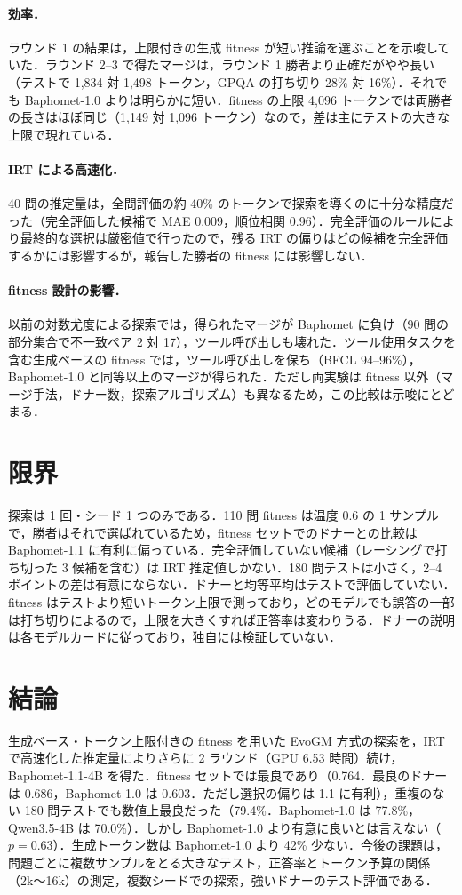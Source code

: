 \documentclass[uplatex,dvipdfmx,10pt,a4paper]{jsarticle}
\begin{document}
\paragraph{効率．}ラウンド 1 の結果は，上限付きの生成 fitness が短い推論を選ぶことを示唆していた．ラウンド 2--3 で得たマージは，ラウンド 1 勝者より正確だがやや長い（テストで 1,834 対 1,498 トークン，GPQA の打ち切り 28\% 対 16\%）．それでも Baphomet-1.0 よりは明らかに短い．fitness の上限 4,096 トークンでは両勝者の長さはほぼ同じ（1,149 対 1,096 トークン）なので，差は主にテストの大きな上限で現れている．

\paragraph{IRT による高速化．}40 問の推定量は，全問評価の約 40\% のトークンで探索を導くのに十分な精度だった（完全評価した候補で MAE 0.009，順位相関 0.96）．完全評価のルールにより最終的な選択は厳密値で行ったので，残る IRT の偏りはどの候補を完全評価するかには影響するが，報告した勝者の fitness には影響しない．

\paragraph{fitness 設計の影響．}以前の対数尤度による探索では，得られたマージが Baphomet に負け（90 問の部分集合で不一致ペア 2 対 17），ツール呼び出しも壊れた．ツール使用タスクを含む生成ベースの fitness では，ツール呼び出しを保ち（BFCL 94--96\%），Baphomet-1.0 と同等以上のマージが得られた．ただし両実験は fitness 以外（マージ手法，ドナー数，探索アルゴリズム）も異なるため，この比較は示唆にとどまる．

\section{限界}
探索は 1 回・シード 1 つのみである．110 問 fitness は温度 0.6 の 1 サンプルで，勝者はそれで選ばれているため，fitness セットでのドナーとの比較は Baphomet-1.1 に有利に偏っている．完全評価していない候補（レーシングで打ち切った 3 候補を含む）は IRT 推定値しかない．180 問テストは小さく，2--4 ポイントの差は有意にならない．ドナーと均等平均はテストで評価していない．fitness はテストより短いトークン上限で測っており，どのモデルでも誤答の一部は打ち切りによるので，上限を大きくすれば正答率は変わりうる．ドナーの説明は各モデルカードに従っており，独自には検証していない．

\section{結論}
生成ベース・トークン上限付きの fitness を用いた EvoGM 方式の探索を，IRT で高速化した推定量によりさらに 2 ラウンド（GPU 6.53 時間）続け，Baphomet-1.1-4B を得た．fitness セットでは最良であり（0.764．最良のドナーは 0.686，Baphomet-1.0 は 0.603．ただし選択の偏りは 1.1 に有利），重複のない 180 問テストでも数値上最良だった（79.4\%．Baphomet-1.0 は 77.8\%，Qwen3.5-4B は 70.0\%）．しかし Baphomet-1.0 より有意に良いとは言えない（$p=0.63$）．生成トークン数は Baphomet-1.0 より 42\% 少ない．今後の課題は，問題ごとに複数サンプルをとる大きなテスト，正答率とトークン予算の関係（2k〜16k）の測定，複数シードでの探索，強いドナーのテスト評価である．
\end{document}
